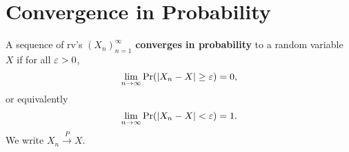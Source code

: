 \documentclass[11pt,fleqn]{book} %
\begin{document}

\section{Convergence in Probability}

\begin{definition} \label{def:421}
A sequence of rv's \((X_n)_{n=1}^\infty\) \textbf{converges in probability} to a random variable \(X\) if for all \(\varepsilon > 0\),
\[
\lim_{n\rightarrow\infty} \Pr(|X_n - X| \geq \varepsilon)= 0,
\]
or equivalently
\[
\lim_{n\rightarrow\infty} \Pr(|X_n - X| < \varepsilon) = 1.
\]
\indent We write \(X_n \xrightarrow{P}X\).
\end{definition}
\end{document}
